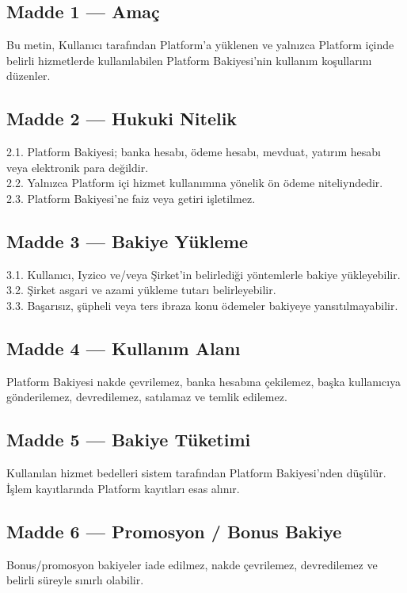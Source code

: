 \documentclass[12pt,a4paper]{article}
\begin{document}
\subsection*{Madde 1 --- Ama\c{c}}
Bu metin, Kullan{\i}c{\i} taraf{\i}ndan Platform'a y\"{u}klenen ve yaln{\i}zca Platform i\c{c}inde belirli
hizmetlerde kullan{\i}labilen Platform Bakiyesi'nin kullan{\i}m ko\c{s}ullar{\i}n{\i} d\"{u}zenler.

\subsection*{Madde 2 --- Hukuki Nitelik}
2.1. Platform Bakiyesi; banka hesab{\i}, \"{o}deme hesab{\i}, mevduat, yat{\i}r{\i}m hesab{\i} veya elektronik
para de\u{g}ildir.\\
2.2. Yaln{\i}zca Platform i\c{c}i hizmet kullan{\i}m{\i}na y\"{o}nelik \"{o}n \"{o}deme niteliyndedir.\\
2.3. Platform Bakiyesi'ne faiz veya getiri i\c{s}letilmez.

\subsection*{Madde 3 --- Bakiye Y\"{u}kleme}
3.1. Kullan{\i}c{\i}, Iyzico ve/veya \c{S}irket'in belirledi\u{g}i y\"{o}ntemlerle bakiye y\"{u}kleyebilir.\\
3.2. \c{S}irket asgari ve azami y\"{u}kleme tutar{\i} belirleyebilir.\\
3.3. Ba\c{s}ar{\i}s{\i}z, \c{s}\"{u}pheli veya ters ibraza konu \"{o}demeler bakiyeye yans{\i}t{\i}lmayabilir.

\subsection*{Madde 4 --- Kullan{\i}m Alan{\i}}
Platform Bakiyesi nakde \c{c}evrilemez, banka hesab{\i}na \c{c}ekilemez, ba\c{s}ka kullan{\i}c{\i}ya
g\"{o}nderilemez, devredilemez, sat{\i}lamaz ve temlik edilemez.

\subsection*{Madde 5 --- Bakiye T\"{u}ketimi}
Kullan{\i}lan hizmet bedelleri sistem taraf{\i}ndan Platform Bakiyesi'nden d\"{u}\c{s}\"{u}l\"{u}r. \.{I}\c{s}lem
kay{\i}tlar{\i}nda Platform kay{\i}tlar{\i} esas al{\i}n{\i}r.

\subsection*{Madde 6 --- Promosyon / Bonus Bakiye}
Bonus/promosyon bakiyeler iade edilmez, nakde \c{c}evrilemez, devredilemez ve belirli
s\"{u}reyle s{\i}n{\i}rl{\i} olabilir.
\end{document}
